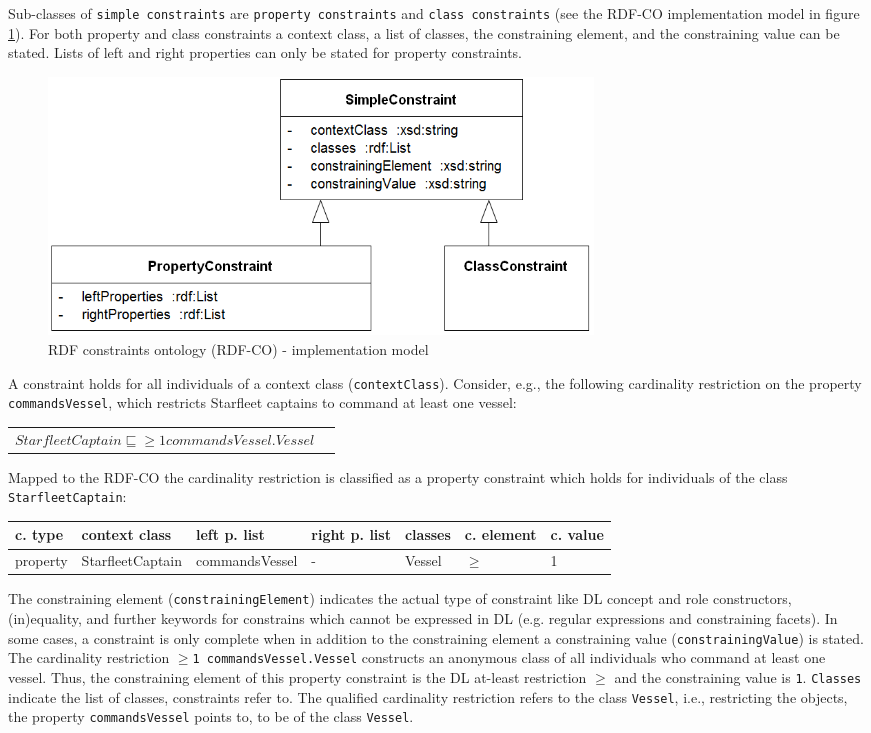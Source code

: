 \documentclass{llncs}
\newcommand{\ms}[1]{\texttt{#1}}
\newenvironment{gcotable}{
  \scriptsize
  \sffamily
  \vspace{0cm}
	\begin{center}
  \begin{tabular}{l|l|l|l|l|l|l}
  \hline
  \textbf{c. type} & \textbf{context class} & \textbf{left p. list} & \textbf{right p. list} & \textbf{classes} & \textbf{c. element} & \textbf{c. value} \\
  \hline

}{
  \hline
  \end{tabular}
	\end{center}
}
\newenvironment{DL}{
  \vspace{0cm}
	\begin{center}
  \begin{tabular}{r l}

}{
  \end{tabular}
	\end{center}
}
\begin{document}
Sub-classes of \ms{simple constraints} are \ms{property constraints} and \ms{class constraints} (see the RDF-CO implementation model in figure \ref{fig:RDF-CO-implementation-model}). 
For both property and class constraints a context class, a list of classes, the constraining element, and the constraining value can be stated. 
Lists of left and right properties can only be stated for property constraints.

\begin{figure}
	\centering
		\includegraphics[width=0.70\textwidth]{images/RDF-CO-implementation-model.png}
	\caption{RDF constraints ontology (RDF-CO) - implementation model}
	\label{fig:RDF-CO-implementation-model}
\end{figure}

A constraint holds for all individuals of a context class (\ms{contextClass}).
Consider, e.g., the following cardinality restriction on the property \ms{commandsVessel}, which restricts Starfleet captains to command at least one vessel: 
\begin{DL}
$StarfleetCaptain \sqsubseteq \geq1 commandsVessel . Vessel $
\end{DL}
Mapped to the RDF-CO the cardinality restriction is classified as a property constraint which holds for individuals of the class \ms{StarfleetCaptain}:
\begin{gcotable}
property & StarfleetCaptain & commandsVessel & - & Vessel & $\geq$ & 1 \\
\end{gcotable}
The constraining element (\ms{constrainingElement}) indicates the actual type of constraint like DL concept and role constructors, (in)equality, and further keywords for constrains which cannot be expressed in DL (e.g. regular expressions and constraining facets).
In some cases, a constraint is only complete when in addition to the constraining element a constraining value (\ms{constrainingValue}) is stated.
The cardinality restriction 
\ms{$\geq$1 commandsVessel.Vessel}
constructs an anonymous class of all individuals who command at least one vessel.
Thus, the constraining element of this property constraint is the DL at-least restriction \ms{$\geq$} and the constraining value is \ms{1}.
\ms{Classes} indicate the list of classes, constraints refer to.
The qualified cardinality restriction refers to the class \ms{Vessel}, 
i.e., restricting the objects, the property \ms{commandsVessel} points to, to be of the class \ms{Vessel}.
\end{document}
